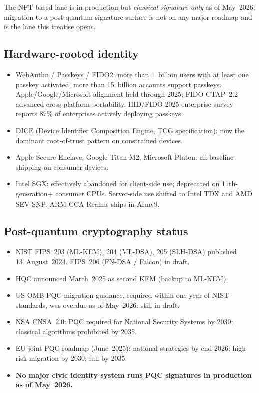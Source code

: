 \documentclass[11pt,a4paper,parskip=half-,DIV=12,headings=standardclasses]{scrartcl}
\theoremstyle{ncthm}
\theoremstyle{ncdef}
\begin{document}
The NFT-based lane is in production but \emph{classical-signature-only}
as of May~2026; migration to a post-quantum signature surface is not
on any major roadmap and is the lane this treatise opens.

\subsection{Hardware-rooted identity}

\begin{itemize}
\item WebAuthn / Passkeys / FIDO2: more than 1~billion users with at
  least one passkey activated; more than 15~billion accounts support
  passkeys. Apple/Google/Microsoft alignment held through 2025; FIDO
  CTAP~2.2 advanced cross-platform portability. HID/FIDO 2025
  enterprise survey reports 87\% of enterprises actively deploying
  passkeys.
\item DICE (Device Identifier Composition Engine, TCG specification):
  now the dominant root-of-trust pattern on constrained devices.
\item Apple Secure Enclave, Google Titan-M2, Microsoft Pluton: all
  baseline shipping on consumer devices.
\item Intel SGX: effectively abandoned for client-side use; deprecated
  on 11th-generation+ consumer CPUs. Server-side use shifted to Intel
  TDX and AMD SEV-SNP. ARM CCA Realms ships in Armv9.
\end{itemize}

\subsection{Post-quantum cryptography status}

\begin{itemize}
\item NIST FIPS~203 (ML-KEM), 204 (ML-DSA), 205 (SLH-DSA) published
  13~August~2024. FIPS~206 (FN-DSA / Falcon) in draft.
\item HQC announced March~2025 as second KEM (backup to ML-KEM).
\item US OMB PQC migration guidance, required within one year of NIST
  standards, was overdue as of May~2026: still in draft.
\item NSA CNSA~2.0: PQC required for National Security Systems by
  2030; classical algorithms prohibited by 2035.
\item EU joint PQC roadmap (June~2025): national strategies by
  end-2026; high-risk migration by 2030; full by 2035.
\item \textbf{No major civic identity system runs PQC signatures in
  production as of May~2026.}
\end{itemize}
\end{document}

